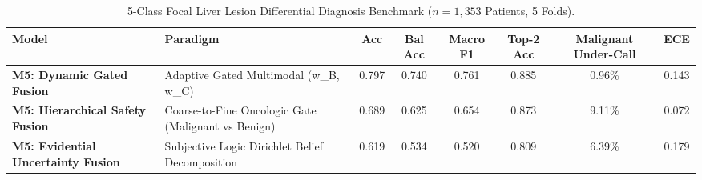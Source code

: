 \begin{table}[t]
\centering
\caption{5-Class Focal Liver Lesion Differential Diagnosis Benchmark ($n=1,353$ Patients, 5 Folds).}
\label{tab:multiclass_ablation}
\begin{tabular}{llcccccc}
\hline
\textbf{Model} & \textbf{Paradigm} & \textbf{Acc} & \textbf{Bal Acc} & \textbf{Macro F1} & \textbf{Top-2 Acc} & \textbf{Malignant Under-Call} & \textbf{ECE} \\
\hline
\textbf{M5: Dynamic Gated Fusion} & Adaptive Gated Multimodal (w_B, w_C) & 0.797 & 0.740 & 0.761 & 0.885 & 0.96\% & 0.143 \\
\textbf{M5: Hierarchical Safety Fusion} & Coarse-to-Fine Oncologic Gate (Malignant vs Benign) & 0.689 & 0.625 & 0.654 & 0.873 & 9.11\% & 0.072 \\
\textbf{M5: Evidential Uncertainty Fusion} & Subjective Logic Dirichlet Belief Decomposition & 0.619 & 0.534 & 0.520 & 0.809 & 6.39\% & 0.179 \\
\hline
\end{tabular}
\end{table}

